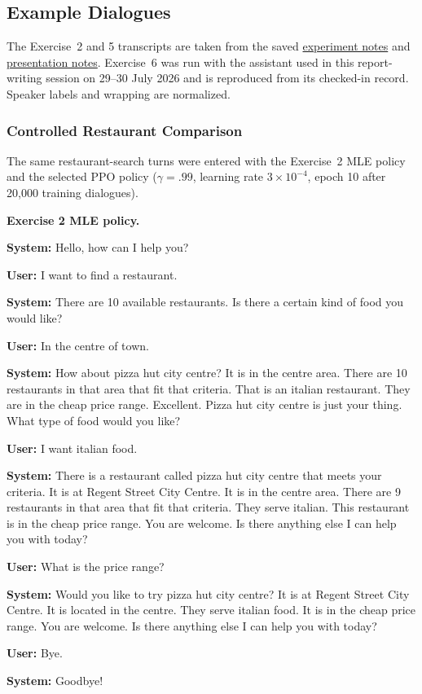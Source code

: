 \documentclass[11pt]{article}
\newcommand{\dialogueturn}[2]{\noindent\textbf{#1:} #2\par\smallskip}
\newcommand{\dialogueheading}[1]{\par\smallskip\noindent\textbf{#1}\par}
\begin{document}
\subsection{Example Dialogues}\label{app:dialogues}
The Exercise~2 and 5 transcripts are taken from the saved
\href{https://github.com/x4ahmed/spoken-dialogue-systems/blob/main/convlab3/Experiment.md}
{experiment notes} and
\href{https://github.com/x4ahmed/spoken-dialogue-systems/blob/main/convlab3/presentation.md}
{presentation notes}. Exercise~6 was run with the assistant used in this
report-writing session on 29--30 July 2026 and is reproduced from its
checked-in record. Speaker labels and wrapping are normalized.

\subsubsection{Controlled Restaurant Comparison}
\label{app:controlled-policy-dialogue}
The same restaurant-search turns were entered with the Exercise~2 MLE policy
and the selected PPO policy ($\gamma=.99$, learning rate $3\times10^{-4}$,
epoch 10 after 20,000 training dialogues).

\dialogueheading{Exercise 2 MLE policy.}

\begingroup
\small
\dialogueturn{System}{Hello, how can I help you?}
\dialogueturn{User}{I want to find a restaurant.}
\dialogueturn{System}{There are 10 available restaurants. Is there a certain
kind of food you would like?}
\dialogueturn{User}{In the centre of town.}
\dialogueturn{System}{How about pizza hut city centre? It is in the centre
area. There are 10 restaurants in that area that fit that criteria. That is an
italian restaurant. They are in the cheap price range. Excellent. Pizza hut
city centre is just your thing. What type of food would you like?}
\dialogueturn{User}{I want italian food.}
\dialogueturn{System}{There is a restaurant called pizza hut city centre that
meets your criteria. It is at Regent Street City Centre. It is in the centre
area. There are 9 restaurants in that area that fit that criteria. They serve
italian. This restaurant is in the cheap price range. You are welcome. Is there
anything else I can help you with today?}
\dialogueturn{User}{What is the price range?}
\dialogueturn{System}{Would you like to try pizza hut city centre? It is at
Regent Street City Centre. It is located in the centre. They serve italian
food. It is in the cheap price range. You are welcome. Is there anything else I
can help you with today?}
\dialogueturn{User}{Bye.}
\dialogueturn{System}{Goodbye!}
\endgroup
\end{document}
